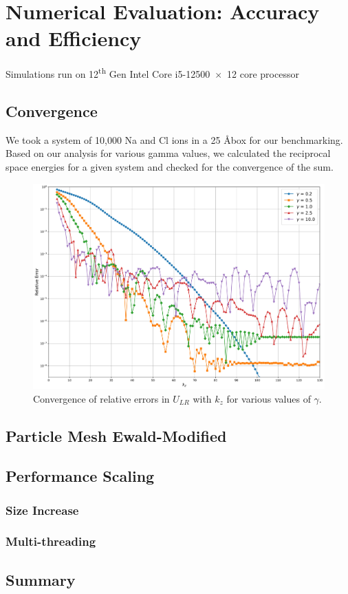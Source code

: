 \chapter{Numerical Evaluation: Accuracy and Efficiency}

\label{Chapter7} %

Simulations run on 12\textsuperscript{th} Gen Intel\textsuperscript{\textregistered} Core\texttrademark{} i5-12500~$\times$~12 core processor
\section{Convergence}
We took a system of 10,000 Na and Cl ions in a 25 \AA box for our benchmarking. Based on our analysis for various gamma values, we calculated the reciprocal space energies for a given system and checked for the convergence of the sum. 
\begin{figure}[]
    \centering
    \includegraphics[scale=0.4]{images/logerror_vs_kz_forreport.jpg}
    \caption{Convergence of relative errors in $U_{LR}$ with $k_z$ for various values of $\gamma$.}
    \label{fig:result1}
\end{figure}
\section{Particle Mesh Ewald-Modified}
\section{Performance Scaling}
\subsection{Size Increase}
\subsection{Multi-threading}

\section{Summary}